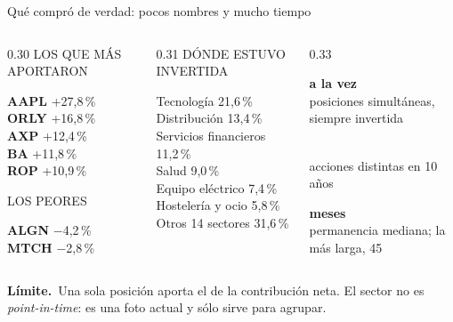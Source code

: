 \documentclass[aspectratio=169,11pt]{beamer}
\newcommand{\cifrachica}[3]{%
  \begin{center}
    {\fontsize{17}{19}\selectfont\color{#3}\textbf{#1}}\\[0.15em]
    {\footnotesize\color{slate}#2}
  \end{center}}
\newcommand{\matiz}[1]{%
  \par\medskip\noindent
  \colorbox{light}{\parbox{\dimexpr\linewidth-2\fboxsep\relax}{%
    \small{\color{gold}\textbf{Límite.}}~#1}}}
\begin{document}
\begin{frame}{Qué compró de verdad: pocos nombres y mucho tiempo}
  \vspace{0.15cm}
  \begin{columns}[T]
    \begin{column}{0.30\linewidth}
      {\scriptsize\color{slate}\MakeUppercase{Los que más aportaron}}
      \par\smallskip
      {\footnotesize
      \textbf{AAPL} \hfill {\color{teal}+27,8\,\%}\\[0.30em]
      \textbf{ORLY} \hfill {\color{teal}+16,8\,\%}\\[0.30em]
      \textbf{AXP} \hfill {\color{teal}+12,4\,\%}\\[0.30em]
      \textbf{BA} \hfill {\color{teal}+11,8\,\%}\\[0.30em]
      \textbf{ROP} \hfill {\color{teal}+10,9\,\%}}
      \par\medskip
      {\scriptsize\color{slate}\MakeUppercase{Los peores}}
      \par\smallskip
      {\footnotesize
      \textbf{ALGN} \hfill {\color{rojo}$-$4,2\,\%}\\[0.30em]
      \textbf{MTCH} \hfill {\color{rojo}$-$2,8\,\%}}
    \end{column}
    \begin{column}{0.31\linewidth}
      {\scriptsize\color{slate}\MakeUppercase{Dónde estuvo invertida}}
      \par\smallskip
      {\footnotesize
      Tecnología \hfill 21,6\,\%\\[0.30em]
      Distribución \hfill 13,4\,\%\\[0.30em]
      Servicios financieros \hfill 11,2\,\%\\[0.30em]
      Salud \hfill 9,0\,\%\\[0.30em]
      Equipo eléctrico \hfill 7,4\,\%\\[0.30em]
      Hostelería y ocio \hfill 5,8\,\%\\[0.30em]
      {\color{slate}Otros 14 sectores} \hfill {\color{slate}31,6\,\%}}
    \end{column}
    \begin{column}{0.33\linewidth}
      \vspace{-0.10cm}
      \cifrachica{\PosicionesCartera{} a la vez}{posiciones simultáneas, siempre invertida}{navy}
      \cifrachica{\NumAccionesCartera}{acciones distintas en 10 años}{navy}
      \cifrachica{\MedianaMesesTenencia{} meses}{permanencia mediana; la más larga, 45}{teal}
    \end{column}
  \end{columns}
  \vspace{0.05cm}
  \matiz{Una sola posición aporta el \ContribucionAAPL{} de la contribución neta. El sector no es
  \textit{point-in-time}: es una foto actual y sólo sirve para agrupar.}
\end{frame}
\end{document}
